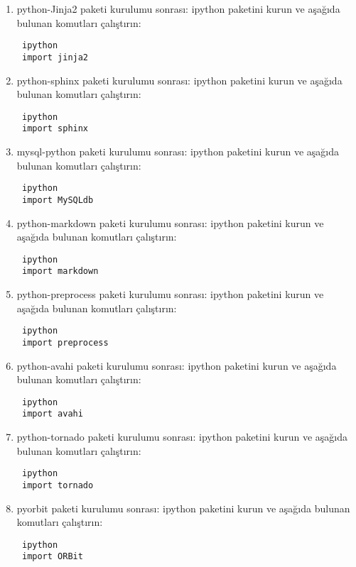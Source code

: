 \documentclass[a4paper,10pt]{article}
\begin{document}
\begin{enumerate}
\item python-Jinja2 paketi kurulumu sonrası:
ipython paketini kurun ve aşağıda bulunan komutları çalıştırın:
\begin{verbatim}
 ipython
 import jinja2
\end{verbatim}

\item python-sphinx paketi kurulumu sonrası:
ipython paketini kurun ve aşağıda bulunan komutları çalıştırın:
\begin{verbatim}
 ipython
 import sphinx
\end{verbatim}


\item mysql-python paketi kurulumu sonrası:
ipython paketini kurun ve aşağıda bulunan komutları çalıştırın:
\begin{verbatim}
 ipython
 import MySQLdb
\end{verbatim}

\item python-markdown paketi kurulumu sonrası:
ipython paketini kurun ve aşağıda bulunan komutları çalıştırın:
\begin{verbatim}
 ipython
 import markdown
\end{verbatim}

\item python-preprocess paketi kurulumu sonrası:
ipython paketini kurun ve aşağıda bulunan komutları çalıştırın:
\begin{verbatim}
 ipython
 import preprocess
\end{verbatim}

\item python-avahi paketi kurulumu sonrası:
ipython paketini kurun ve aşağıda bulunan komutları çalıştırın:
\begin{verbatim}
 ipython
 import avahi
\end{verbatim}

\item python-tornado paketi kurulumu sonrası:
ipython paketini kurun ve aşağıda bulunan komutları çalıştırın:
\begin{verbatim}
 ipython
 import tornado
\end{verbatim}

\item pyorbit paketi kurulumu sonrası:
ipython paketini kurun ve aşağıda bulunan komutları çalıştırın:
\begin{verbatim}
 ipython
 import ORBit
\end{verbatim}


\end{enumerate}
\end{document}
